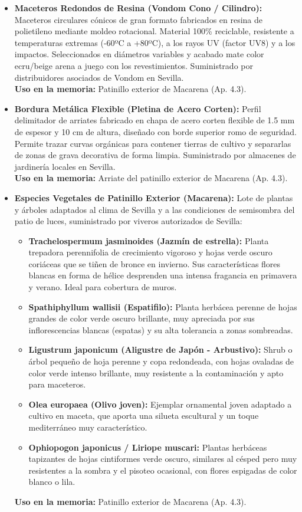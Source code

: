 \documentclass[12pt,a4paper]{article}
\begin{document}
\begin{itemize}
    \item \textbf{Maceteros Redondos de Resina (Vondom Cono / Cilindro):} Maceteros circulares cónicos de gran formato fabricados en resina de polietileno mediante moldeo rotacional. Material 100\% reciclable, resistente a temperaturas extremas (-60ºC a +80ºC), a los rayos UV (factor UV8) y a los impactos. Seleccionados en diámetros variables y acabado mate color ecru/beige arena a juego con los revestimientos. Suministrado por distribuidores asociados de Vondom en Sevilla. \\ \textbf{Uso en la memoria:} Patinillo exterior de Macarena (Ap. 4.3).
    
    \item \textbf{Bordura Metálica Flexible (Pletina de Acero Corten):} Perfil delimitador de arriates fabricado en chapa de acero corten flexible de 1.5 mm de espesor y 10 cm de altura, diseñado con borde superior romo de seguridad. Permite trazar curvas orgánicas para contener tierras de cultivo y separarlas de zonas de grava decorativa de forma limpia. Suministrado por almacenes de jardinería locales en Sevilla. \\ \textbf{Uso en la memoria:} Arriate del patinillo exterior de Macarena (Ap. 4.3).
    
    \item \textbf{Especies Vegetales de Patinillo Exterior (Macarena):} Lote de plantas y árboles adaptados al clima de Sevilla y a las condiciones de semisombra del patio de luces, suministrado por viveros autorizados de Sevilla:
    \begin{itemize}
        \item \textbf{Trachelospermum jasminoides (Jazmín de estrella):} Planta trepadora perennifolia de crecimiento vigoroso y hojas verde oscuro coriáceas que se tiñen de bronce en invierno. Sus características flores blancas en forma de hélice desprenden una intensa fragancia en primavera y verano. Ideal para cobertura de muros.
        \item \textbf{Spathiphyllum wallisii (Espatifilo):} Planta herbácea perenne de hojas grandes de color verde oscuro brillante, muy apreciada por sus inflorescencias blancas (espatas) y su alta tolerancia a zonas sombreadas.
        \item \textbf{Ligustrum japonicum (Aligustre de Japón - Arbustivo):} Shrub o árbol pequeño de hoja perenne y copa redondeada, con hojas ovaladas de color verde intenso brillante, muy resistente a la contaminación y apto para maceteros.
        \item \textbf{Olea europaea (Olivo joven):} Ejemplar ornamental joven adaptado a cultivo en maceta, que aporta una silueta escultural y un toque mediterráneo muy característico.
        \item \textbf{Ophiopogon japonicus / Liriope muscari:} Plantas herbáceas tapizantes de hojas cintiformes verde oscuro, similares al césped pero muy resistentes a la sombra y el pisoteo ocasional, con flores espigadas de color blanco o lila.
    \end{itemize}
    \textbf{Uso en la memoria:} Patinillo exterior de Macarena (Ap. 4.3).
    

\end{itemize}
\end{document}
